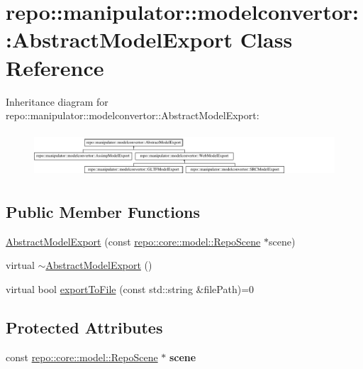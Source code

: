 \hypertarget{classrepo_1_1manipulator_1_1modelconvertor_1_1_abstract_model_export}{}\section{repo\+:\+:manipulator\+:\+:modelconvertor\+:\+:Abstract\+Model\+Export Class Reference}
\label{classrepo_1_1manipulator_1_1modelconvertor_1_1_abstract_model_export}
Inheritance diagram for repo\+:\+:manipulator\+:\+:modelconvertor\+:\+:Abstract\+Model\+Export\+:\begin{figure}[H]
\begin{center}
\leavevmode
\includegraphics[height=1.671642cm]{classrepo_1_1manipulator_1_1modelconvertor_1_1_abstract_model_export}
\end{center}
\end{figure}
\subsection*{Public Member Functions}
\begin{DoxyCompactItemize}
\item 
\hyperlink{classrepo_1_1manipulator_1_1modelconvertor_1_1_abstract_model_export_a3e6a25bf60432759ce8be3837e46f309}{Abstract\+Model\+Export} (const \hyperlink{classrepo_1_1core_1_1model_1_1_repo_scene}{repo\+::core\+::model\+::\+Repo\+Scene} $\ast$scene)
\item 
virtual \hyperlink{classrepo_1_1manipulator_1_1modelconvertor_1_1_abstract_model_export_aecc655342a092127ed432a05da375291}{$\sim$\+Abstract\+Model\+Export} ()
\item 
virtual bool \hyperlink{classrepo_1_1manipulator_1_1modelconvertor_1_1_abstract_model_export_a305f2967d8112c5417b80fd3e8b8902a}{export\+To\+File} (const std\+::string \&file\+Path)=0
\end{DoxyCompactItemize}
\subsection*{Protected Attributes}
\begin{DoxyCompactItemize}
\item 
\hypertarget{classrepo_1_1manipulator_1_1modelconvertor_1_1_abstract_model_export_a7eb8d447b8a3a5687c682369dff23a70}{}const \hyperlink{classrepo_1_1core_1_1model_1_1_repo_scene}{repo\+::core\+::model\+::\+Repo\+Scene} $\ast$ {\bfseries scene}\label{classrepo_1_1manipulator_1_1modelconvertor_1_1_abstract_model_export_a7eb8d447b8a3a5687c682369dff23a70}

\end{DoxyCompactItemize}


